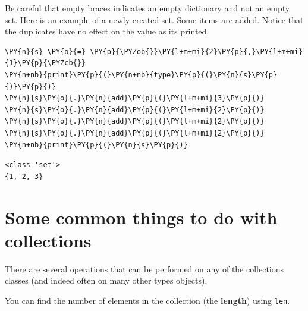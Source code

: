 Be careful that empty braces \texttt{{}} indicates an empty dictionary and not an empty set.  Here is an example of a newly created set.  Some items are added.  Notice that the duplicates have no effect on the value as its printed.


\begin{Verbatim}[commandchars=\\\{\}]
\PY{n}{s} \PY{o}{=} \PY{p}{\PYZob{}}\PY{l+m+mi}{2}\PY{p}{,}\PY{l+m+mi}{1}\PY{p}{\PYZcb{}}
\PY{n+nb}{print}\PY{p}{(}\PY{n+nb}{type}\PY{p}{(}\PY{n}{s}\PY{p}{)}\PY{p}{)}
\PY{n}{s}\PY{o}{.}\PY{n}{add}\PY{p}{(}\PY{l+m+mi}{3}\PY{p}{)}
\PY{n}{s}\PY{o}{.}\PY{n}{add}\PY{p}{(}\PY{l+m+mi}{2}\PY{p}{)}
\PY{n}{s}\PY{o}{.}\PY{n}{add}\PY{p}{(}\PY{l+m+mi}{2}\PY{p}{)}
\PY{n}{s}\PY{o}{.}\PY{n}{add}\PY{p}{(}\PY{l+m+mi}{2}\PY{p}{)}
\PY{n+nb}{print}\PY{p}{(}\PY{n}{s}\PY{p}{)}
\end{Verbatim}

\begin{Verbatim}
<class 'set'>
{1, 2, 3}

\end{Verbatim}

\section{Some common things to do with collections}


There are several operations that can be performed on any of the collections classes (and indeed often on many other types objects).


You can find the number of elements in the collection (the \textbf{length}) using \texttt{len}.


